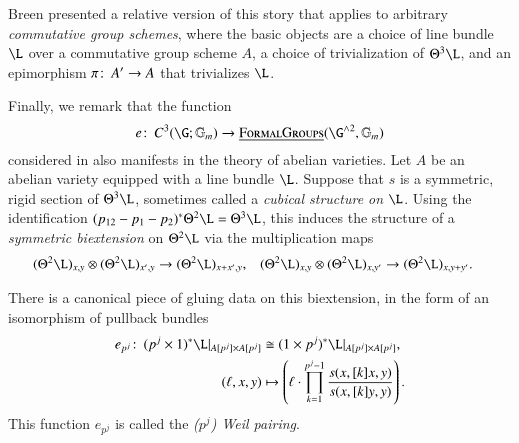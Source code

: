 \begin{remark}
Breen presented a relative version of this story that applies to arbitrary \emph{commutative group schemes}, where the basic objects are a choice of line bundle $\L$ over a commutative group scheme $A$, a choice of trivialization of $\Theta^3 \L$, and an epimorphism $\pi\colon\thinspace A' \to A$ that trivializes $\L$.
\end{remark}

Finally, we remark that the function \[e\co C^3(\G; \Gm) \to \InternalHom{FormalGroups}(\G^{\sm 2}, \Gm)\] considered in  also manifests in the theory of abelian varieties.  Let $A$ be an abelian variety equipped with a line bundle $\L$.  Suppose that $s$ is a symmetric, rigid section of $\Theta^3 \L$, sometimes called a \textit{cubical structure on $\L$}.  Using the identification $(p_{12} - p_1 - p_2)^* \Theta^2 \L = \Theta^3 \L$, this induces the structure of a \textit{symmetric biextension} on $\Theta^2 \L$ via the multiplication maps
\begin{align*}
(\Theta^2 \L)_{x, y} \otimes (\Theta^2 \L)_{x', y} & \to (\Theta^2 \L)_{x + x', y}, &
(\Theta^2 \L)_{x, y} \otimes (\Theta^2 \L)_{x, y'} & \to (\Theta^2 \L)_{x, y + y'}.
\end{align*}

\begin{definition}
There is a canonical piece of gluing data on this biextension, in the form of an isomorphism of pullback bundles
\begin{align*}
e_{p^j}\co (p^j \times 1)^* \L|_{A[p^j] \times A[p^j]} & \cong (1 \times p^j)^* \L|_{A[p^j] \times A[p^j]}, \\
(\ell, x, y) & \mapsto \left(\ell \cdot \prod_{k=1}^{p^j-1} \frac{s(x, [k]x, y)}{s(x, [k]y, y)} \right).
\end{align*}
This function $e_{p^j}$ is called the \textit{($p^j$){\th} Weil pairing}.
\end{definition}

